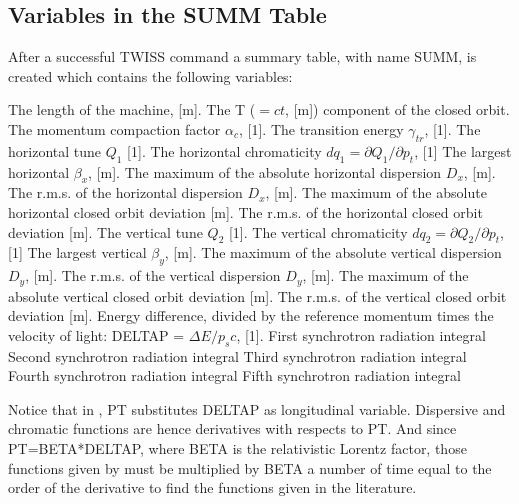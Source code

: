 \subsection{Variables in the SUMM Table}
\label{subsec:tables_summ}
After a successful TWISS command a summary table, with name SUMM, is created which
contains the following variables:  
\begin{madlist}
   The length of the machine, [m].     
   The T ($= c t$, [m]) component of the closed orbit.     
   The momentum compaction factor $\alpha_c$, [1].     
   The transition energy $\gamma_{tr}$, [1].     
   The horizontal tune $Q_1$ [1].     
   The horizontal chromaticity $dq_1 = \partial Q_1 / \partial p_t$, [1]
   The largest horizontal $\beta_x$, [m].     
   The maximum of the absolute horizontal dispersion $D_x$, [m].     
   The r.m.s. of the horizontal dispersion $D_x$, [m].     
   The maximum of the absolute horizontal closed orbit deviation [m].     
   The r.m.s. of the horizontal closed orbit deviation [m].     
   The vertical tune $Q_2$ [1].     
   The vertical chromaticity $dq_2 = \partial Q_2 / \partial p_t$, [1]
   The largest vertical $\beta_y$, [m].     
   The maximum of the absolute vertical dispersion $D_y$, [m].     
   The r.m.s. of the vertical dispersion $D_y$, [m].     
   The maximum of the absolute vertical closed orbit deviation [m].     
   The r.m.s. of the vertical closed orbit deviation [m].     
   Energy difference, divided by the reference
  momentum times the velocity of light: DELTAP = $\Delta E / p_s c$, [1].
   First synchrotron radiation integral  
   Second synchrotron radiation integral  
   Third synchrotron radiation integral  
   Fourth synchrotron radiation integral  
   Fifth synchrotron radiation integral  
\end{madlist} 

Notice that in \madx, PT substitutes DELTAP as longitudinal
variable. Dispersive and chromatic functions are hence derivatives with
respects to PT.
And since PT=BETA*DELTAP, where BETA is the relativistic Lorentz 
factor, those functions given by \madx must be multiplied by BETA a
number of time equal to the order of the derivative to find the
functions given in the literature. 

